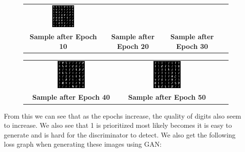 \documentclass{article}
\begin{document}
\begin{titlepage}
\begin{figure} [H]
\begin{tabular}{cccc}
\includegraphics[width=0.3\textwidth]{sample_30_GAN.png} \\
\textbf{ Sample after Epoch 10 }  & \textbf{ Sample after Epoch 20 } & \textbf{ Sample after Epoch 30 }  \\[6pt]
\end{tabular}
\begin{tabular}{cccc}
\includegraphics[width=0.3\textwidth]{sample_40_GAN.png} &
\includegraphics[width=0.3\textwidth]{sample_50_GAN.png} \\
\textbf{ Sample after Epoch 40 }  & \textbf{ Sample after Epoch 50 } 
\end{tabular}
\end{figure}
From this we can see that as the epochs increase, the quality of digits also seem to increase. We also see that 1 is prioritized most likely becomes it is easy to generate and is hard for the discriminator to detect. We also get the following loss graph when generating these images using GAN:
\begin{center}
\begin{tabular}{cc}

\end{tabular}
\end{center}
\end{titlepage}
\end{document}
